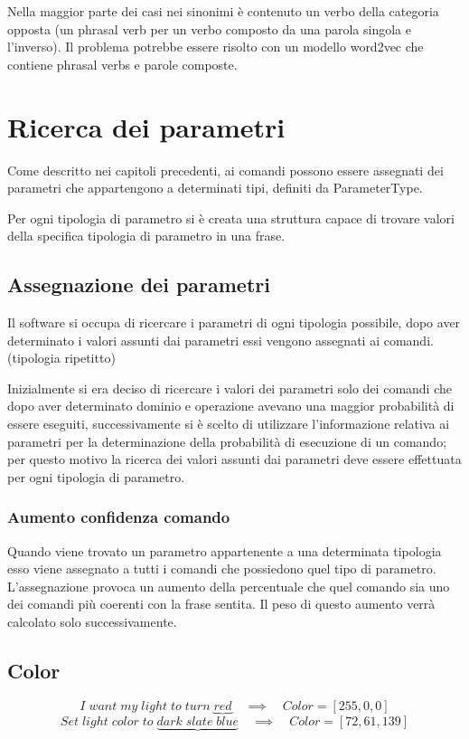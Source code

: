\documentclass[twoside]{supsistudent}
\begin{document}
Nella maggior parte dei casi nei sinonimi è contenuto un verbo della categoria opposta (un phrasal verb per un verbo composto da una parola singola e l'inverso).
Il problema potrebbe essere risolto con un modello word2vec che contiene phrasal verbs e parole composte.

\chapter{Ricerca dei parametri}
Come descritto nei capitoli precedenti, ai comandi possono essere assegnati dei parametri che appartengono a determinati tipi, definiti da ParameterType.

Per ogni tipologia di parametro si è creata una struttura capace di trovare valori della specifica tipologia di parametro in una frase.
\section{Assegnazione dei parametri}
Il software si occupa di ricercare i parametri di ogni tipologia possibile, dopo aver determinato i valori assunti dai parametri essi vengono assegnati ai comandi. (tipologia ripetitto)

Inizialmente si era deciso di ricercare i valori dei parametri solo dei comandi che dopo aver determinato dominio e operazione avevano una maggior probabilità di essere eseguiti, successivamente si è scelto di utilizzare l'informazione relativa ai parametri per la determinazione della probabilità di esecuzione di un comando; per questo motivo la ricerca dei valori assunti dai parametri deve essere effettuata per ogni tipologia di parametro.
\subsection{Aumento confidenza comando}
Quando viene trovato un parametro appartenente a una determinata tipologia esso viene assegnato a tutti i comandi che possiedono quel tipo di parametro. L'assegnazione provoca un aumento della percentuale che quel comando sia uno dei comandi più coerenti con la frase sentita. Il peso di questo aumento verrà calcolato solo successivamente.
\newpage{}
\section{Color}
\begin{center}
\[
I\;want\;my\;light\;to\;turn\;
\underbrace{red}
\quad\implies\quad Color = [255,0,0]
\]
\[
Set\;light\;color\;to\;
\underbrace{dark\;slate\;blue}
\quad\implies\quad Color = [72,61,139]
\]
\end{center}
\end{document}
